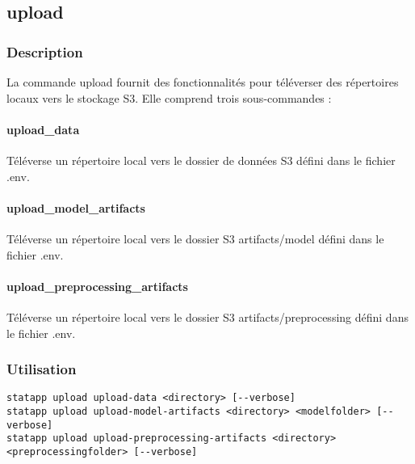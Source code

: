 \documentclass{article}
\begin{document}
\subsection{upload}
\subsubsection{Description}
La commande upload fournit des fonctionnalités pour téléverser des répertoires locaux vers le stockage S3. Elle comprend trois sous-commandes :

\paragraph{upload\_data}
Téléverse un répertoire local vers le dossier de données S3 défini dans le fichier .env.

\paragraph{upload\_model\_artifacts}
Téléverse un répertoire local vers le dossier S3 artifacts/model défini dans le fichier .env.

\paragraph{upload\_preprocessing\_artifacts}
Téléverse un répertoire local vers le dossier S3 artifacts/preprocessing défini dans le fichier .env.

\subsubsection{Utilisation}
\begin{lstlisting}
statapp upload upload-data <directory> [--verbose]
statapp upload upload-model-artifacts <directory> <modelfolder> [--verbose]
statapp upload upload-preprocessing-artifacts <directory> <preprocessingfolder> [--verbose]
\end{lstlisting}
\end{document}
